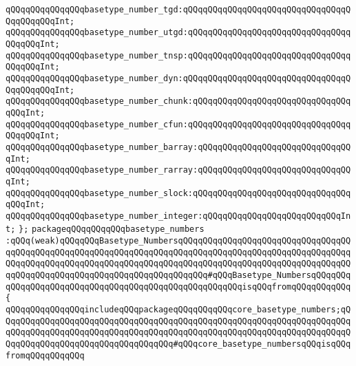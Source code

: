 \verb|qQQqqQQqqQQqqQQqbasetype_number_tgd:qQQqqQQqqQQqqQQqqQQqqQQqqQQqqQQqqQQqqQQqqQQqInt;|\newline
\verb|qQQqqQQqqQQqqQQqbasetype_number_utgd:qQQqqQQqqQQqqQQqqQQqqQQqqQQqqQQqqQQqqQQqInt;|\newline
\verb|qQQqqQQqqQQqqQQqbasetype_number_tnsp:qQQqqQQqqQQqqQQqqQQqqQQqqQQqqQQqqQQqqQQqInt;|\newline
\verb|qQQqqQQqqQQqqQQqbasetype_number_dyn:qQQqqQQqqQQqqQQqqQQqqQQqqQQqqQQqqQQqqQQqqQQqInt;|\newline
\verb|qQQqqQQqqQQqqQQqbasetype_number_chunk:qQQqqQQqqQQqqQQqqQQqqQQqqQQqqQQqqQQqInt;|\newline
\verb|qQQqqQQqqQQqqQQqbasetype_number_cfun:qQQqqQQqqQQqqQQqqQQqqQQqqQQqqQQqqQQqqQQqInt;|\newline
\verb|qQQqqQQqqQQqqQQqbasetype_number_barray:qQQqqQQqqQQqqQQqqQQqqQQqqQQqqQQqInt;|\newline
\verb|qQQqqQQqqQQqqQQqbasetype_number_rarray:qQQqqQQqqQQqqQQqqQQqqQQqqQQqqQQqInt;|\newline
\verb|qQQqqQQqqQQqqQQqbasetype_number_slock:qQQqqQQqqQQqqQQqqQQqqQQqqQQqqQQqqQQqInt;|\newline
\verb|qQQqqQQqqQQqqQQqbasetype_number_integer:qQQqqQQqqQQqqQQqqQQqqQQqqQQqInt;|\newline
\verb|};|\newline
\newline
\newline
\newline
\verb|packageqQQqqQQqqQQqbasetype_numbers|\newline
\verb|:qQQq(weak)qQQqqQQqBasetype_NumbersqQQqqQQqqQQqqQQqqQQqqQQqqQQqqQQqqQQqqQQqqQQqqQQqqQQqqQQqqQQqqQQqqQQqqQQqqQQqqQQqqQQqqQQqqQQqqQQqqQQqqQQqqQQqqQQqqQQqqQQqqQQqqQQqqQQqqQQqqQQqqQQqqQQqqQQqqQQqqQQqqQQqqQQqqQQqqQQqqQQqqQQqqQQqqQQqqQQqqQQqqQQqqQQqqQQqqQQq#qQQqBasetype_NumbersqQQqqQQqqQQqqQQqqQQqqQQqqQQqqQQqqQQqqQQqqQQqqQQqqQQqqQQqisqQQqfromqQQqqQQqqQQq|\newline
\verb|{|\newline
\verb|qQQqqQQqqQQqqQQqincludeqQQqpackageqQQqqQQqqQQqcore_basetype_numbers;qQQqqQQqqQQqqQQqqQQqqQQqqQQqqQQqqQQqqQQqqQQqqQQqqQQqqQQqqQQqqQQqqQQqqQQqqQQqqQQqqQQqqQQqqQQqqQQqqQQqqQQqqQQqqQQqqQQqqQQqqQQqqQQqqQQqqQQqqQQqqQQqqQQqqQQqqQQqqQQqqQQqqQQqqQQqqQQq#qQQqcore_basetype_numbersqQQqisqQQqfromqQQqqQQqqQQq|\newline

